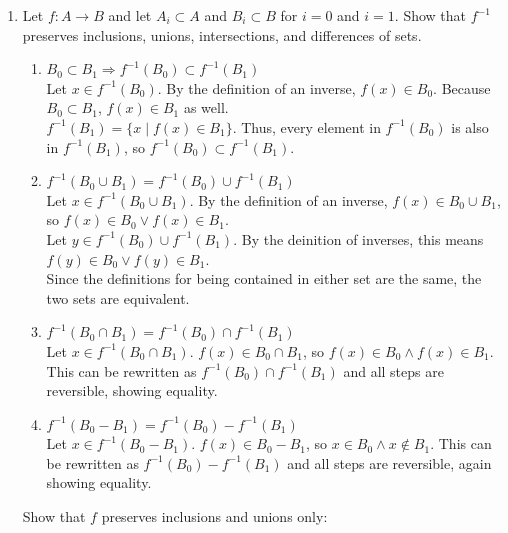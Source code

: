 \documentclass{article}
\begin{document}
\begin{enumerate}
\begin{enumerate}
            \end{enumerate}
      \item Let $f:A \to B$ and let $A_{i} \subset A$ and $B_{i} \subset B$ for $i = 0$ and $i = 1$. Show that $f^{-1}$ preserves inclusions, unions, intersections, and differences of sets.
            \begin{enumerate}
                  \item $B_{0} \subset B_{1} \Rightarrow f^{-1}(B_{0}) \subset f^{-1}(B_{1})$\\
                        Let $x \in f^{-1}(B_{0})$. By the definition of an inverse, $f(x) \in B_{0}$. Because $B_{0} \subset B_{1}$, $f(x) \in B_{1}$ as well.\\
                        $f^{-1}(B_{1}) = \{x \mid f(x) \in B_{1}\}$. Thus, every element in $f^{-1}(B_{0})$ is also in $f^{-1}(B_{1})$, so $f^{-1}(B_{0}) \subset f^{-1}(B_{1})$.
                  \item $f^{-1}(B_{0} \cup B_{1}) = f^{-1}(B_{0})\cup f^{-1}(B_{1})$\\
                        Let $x \in f^{-1}(B_{0} \cup B_{1})$. By the definition of an inverse, $f(x) \in B_{0} \cup B_{1}$, so $f(x) \in B_{0} \lor f(x) \in B_{1}$.\\
                        Let $y \in f^{-1}(B_{0})\cup f^{-1}(B_{1})$. By the deinition of inverses, this means $f(y) \in B_{0} \lor f(y) \in B_{1}$.\\
                        Since the definitions for being contained in either set are the same, the two sets are equivalent.
                  \item $f^{-1}(B_{0} \cap B_{1}) = f^{-1}(B_{0})\cap f^{-1}(B_{1})$\\
                        Let $x \in f^{-1}(B_{0} \cap B_{1})$. $f(x) \in B_{0} \cap B_{1}$, so $f(x) \in B_{0} \land f(x) \in B_{1}$. This can be rewritten as $f^{-1}(B_{0})\cap f^{-1}(B_{1})$ and all steps are reversible, showing equality.
                  \item $f^{-1}(B_{0} - B_{1}) = f^{-1}(B_{0}) - f^{-1}(B_{1})$\\
                        Let $x \in f^{-1}(B_{0} - B_{1})$. $f(x) \in B_{0} - B_{1}$, so $x \in B_{0} \land x \notin B_{1}$. This can be rewritten as $f^{-1}(B_{0}) - f^{-1}(B_{1})$ and all steps are reversible, again showing equality.
            \end{enumerate}
            Show that $f$ preserves inclusions and unions only:
            \begin{enumerate}

\end{enumerate}
\end{enumerate}
\end{document}
